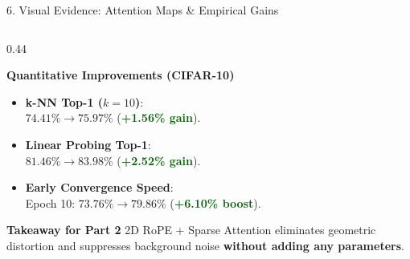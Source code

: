 \documentclass[aspectratio=169,10pt]{beamer}
\begin{document}
\begin{frame}{6. Visual Evidence: Attention Maps \& Empirical Gains}
\begin{columns}[c]
    \begin{column}{0.44\textwidth}
        \begin{exampleblock}{\textbf{Quantitative Improvements (CIFAR-10)}}
            \small
            \begin{itemize}\setlength{\itemsep}{4pt}
                \item \textbf{k-NN Top-1 ($k=10$)}:\\
                $74.41\% \to \mathbf{75.97\%}$ (\textcolor{darkgreen}{\textbf{+1.56\% gain}}).
                \item \textbf{Linear Probing Top-1}:\\
                $81.46\% \to \mathbf{83.98\%}$ (\textcolor{darkgreen}{\textbf{+2.52\% gain}}).
                \item \textbf{Early Convergence Speed}:\\
                Epoch 10: $73.76\% \to \mathbf{79.86\%}$ (\textcolor{darkgreen}{\textbf{+6.10\% boost}}).
            \end{itemize}
        \end{exampleblock}
        \vspace{-0.2em}
        \begin{block}{\textbf{Takeaway for Part 2}}
            \footnotesize
            2D RoPE + Sparse Attention eliminates geometric distortion and suppresses background noise \textbf{without adding any parameters}.
        \end{block}
    \end{column}
\end{columns}
\end{frame}
\end{document}
